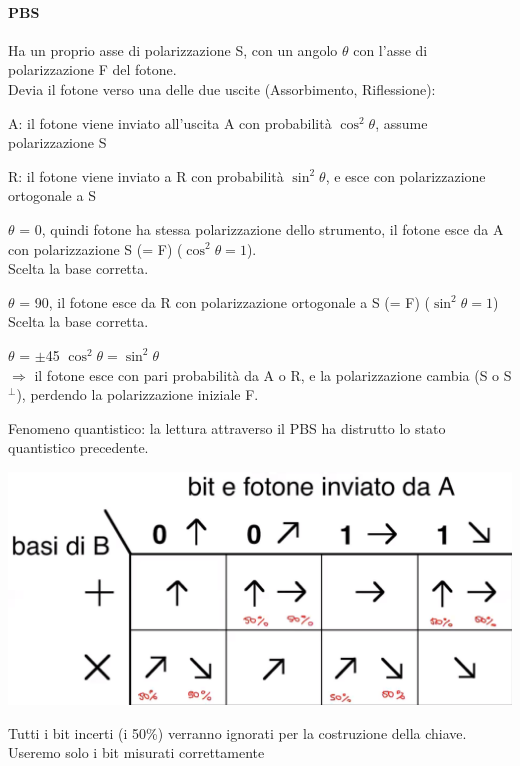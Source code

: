 \documentclass[10pt]{book}
\begin{document}
\paragraph{PBS} Ha un proprio asse di polarizzazione S, con un angolo $\theta$ con l'asse di polarizzazione F del fotone.\\
Devia il fotone verso una delle due uscite (Assorbimento, Riflessione):
\begin{list}{}{}
	\item A: il fotone viene inviato all'uscita A con probabilità $\cos^2\theta$, assume polarizzazione S
	\item R: il fotone viene inviato a R con probabilità $\sin^2\theta$, e esce con polarizzazione ortogonale a S
\end{list}
\begin{list}{}{Angolo:}
	\item $\theta$ = 0, quindi fotone ha stessa polarizzazione dello strumento, il fotone esce da A con polarizzazione S (= F) ($\cos^2\theta = 1$).\\
	Scelta la base corretta.
	\item $\theta$ = 90, il fotone esce da R con polarizzazione ortogonale a S (= F) ($\sin^2\theta = 1$)\\
	Scelta la base corretta.
	\item $\theta$ = $\pm$45 $\cos^2\theta = \sin^2\theta$\\
	$\Rightarrow$ il fotone esce con pari probabilità da A o R, e la polarizzazione cambia (S o S$^\perp$), perdendo la polarizzazione iniziale F.
\end{list}
Fenomeno quantistico: la lettura attraverso il PBS ha distrutto lo stato quantistico precedente.
\begin{center}
	\includegraphics[scale=0.3]{22.png}
\end{center}
Tutti i bit incerti (i 50\%) verranno ignorati per la costruzione della chiave. Useremo solo i bit misurati correttamente
\end{document}
